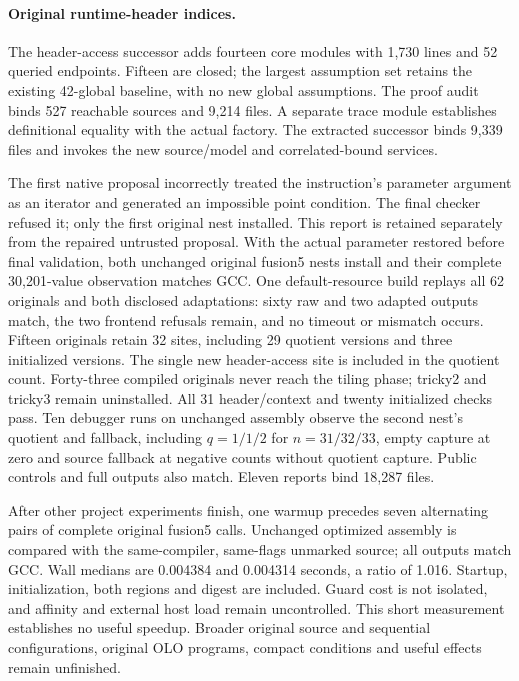 \paragraph{Original runtime-header indices.}
The header-access successor adds fourteen core modules with 1,730 lines and
52 queried endpoints. Fifteen are closed; the largest assumption set retains
the existing 42-global baseline, with no new global assumptions. The proof audit
binds 527 reachable sources and 9,214 files. A separate trace module establishes
definitional equality with the actual factory. The extracted successor binds
9,339 files and invokes the new source/model and correlated-bound services.

The first native proposal incorrectly treated the instruction's parameter
argument as an iterator and generated an impossible point condition. The final
checker refused it; only the first original nest installed. This report is
retained separately from the repaired untrusted proposal. With the actual
parameter restored before final validation, both unchanged original fusion5
nests install and their complete 30,201-value observation matches GCC.
One default-resource build replays all 62 originals and both disclosed
adaptations: sixty raw and two adapted outputs match, the two frontend refusals
remain, and no timeout or mismatch occurs. Fifteen originals retain 32 sites,
including 29 quotient versions and three initialized versions. The single new
header-access site is included in the quotient count. Forty-three compiled
originals never reach the tiling phase; tricky2 and tricky3 remain uninstalled.
All 31 header/context and twenty initialized checks pass. Ten debugger runs on
unchanged assembly observe the second nest's quotient and fallback, including
$q=1/1/2$ for $n=31/32/33$, empty capture at zero and source fallback at negative
counts without quotient capture. Public controls and full outputs also match.
Eleven reports bind 18,287 files.

After other project experiments finish, one warmup precedes seven alternating
pairs of complete original fusion5 calls. Unchanged optimized assembly is
compared with the same-compiler, same-flags unmarked source; all outputs match
GCC. Wall medians are 0.004384 and 0.004314 seconds, a ratio of 1.016. Startup,
initialization, both regions and digest are included. Guard cost is not isolated,
and affinity and external host load remain uncontrolled. This short measurement
establishes no useful speedup. Broader original source and sequential
configurations, original OLO programs, compact conditions and useful effects
remain unfinished.

